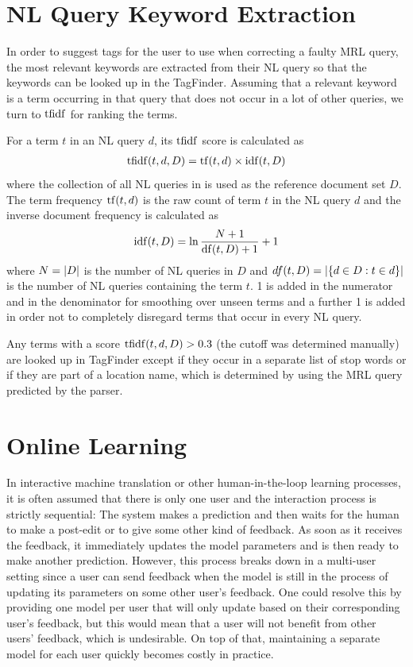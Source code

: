 \section{NL Query Keyword Extraction}
\label{sec:keyword-extraction}

In order to suggest tags for the user to use when correcting a faulty MRL query,
the most relevant keywords are extracted from their NL query so that the
keywords can be looked up in the TagFinder. Assuming that a relevant keyword is
a term occurring in that query that does not occur in a lot of other queries, we
turn to \(\operatorname{tfidf}\) for ranking the terms.

For a term \(t\) in an NL query \(d\), its \(\operatorname{tfidf}\) score is calculated as
\begin{align}
  \operatorname{tfidf} (t, d, D) = \operatorname{tf}(t, d) \times \operatorname{idf}(t, D)
\end{align}
where the collection of all NL queries in \nlmapsthree{} is used as the
reference document set \(D\). The term frequency \(\operatorname{tf}(t, d)\) is the raw count
of term \(t\) in the NL query \(d\) and the inverse document frequency is
calculated as
\begin{align}
  \operatorname{idf}(t, D) = \ln \frac{N + 1}{\operatorname{df}(t, D) + 1} + 1
\end{align}
where \(N = \left|D\right|\) is the number of NL queries in \(D\) and \(df(t, D) =
\left|\left\{ d \in D : t \in d \right\}\right|\) is the number of NL queries
containing the term \(t\). \num{1} is added in the numerator and in the
denominator for smoothing over unseen terms and a further \num{1} is added in
order not to completely disregard terms that occur in every NL query.

Any terms with a score \(\operatorname{tfidf}(t, d, D) > 0.3\) (the cutoff was determined
manually) are looked up in TagFinder except if they occur in a separate list of
stop words or if they are part of a location name, which is determined by using
the MRL query predicted by the parser.

\section{Online Learning}

In interactive machine translation or other human-in-the-loop learning
processes, it is often assumed that there is only one user and the interaction
process is strictly sequential: The system makes a prediction and then waits for
the human to make a post-edit or to give some other kind of feedback. As soon as
it receives the feedback, it immediately updates the model parameters and is
then ready to make another prediction. However, this process breaks down in a
multi-user setting since a user can send feedback when the model is still in the
process of updating its parameters on some other user’s feedback. One could
resolve this by providing one model per user that will only update based on
their corresponding user’s feedback, but this would mean that a user will not
benefit from other users’ feedback, which is undesirable. On top of that,
maintaining a separate model for each user quickly becomes costly in practice.

